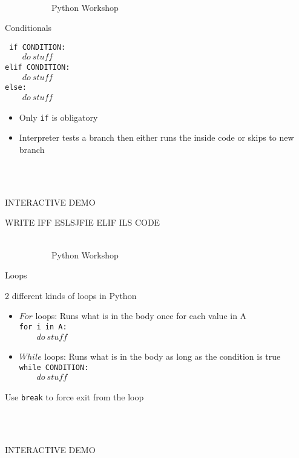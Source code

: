 \documentclass[10pt, xcolor=dvisnames]{beamer}
\begin{document}
\begin{frame}{{\tiny \ \\\vspace{-13pt} \ \ \ \ \ \ \ \ \ \ \ Python Workshop}\\ \centerline{Conditionals}}
\vspace*{-50pt}
\begin{center}
\texttt{
if CONDITION:\\
\ \ \ \ $do\ stuff$\\
elif CONDITION:\\
\ \ \ \ $do\ stuff$\\
else:\\
\ \ \ \ $do\ stuff$\\}\end{center}

\begin{itemize}
\item Only \texttt{if} is obligatory
\item Interpreter tests a branch then either runs the inside code or skips to new branch
\end{itemize}


\ \\
\ \\
\centerline{INTERACTIVE DEMO}
WRITE IFF ESLSJFIE ELIF ILS CODE


\end{frame}





\begin{frame}{{\tiny \ \\\vspace{-13pt} \ \ \ \ \ \ \ \ \ \ \ Python Workshop}\\ \centerline{Loops}}
\vspace*{-50pt}

2 different kinds of loops in Python
\begin{itemize}
\item $For$ loops: Runs what is in the body once for each value in A\\
\texttt{for i in A:\\
\ \ \ \ $do\ stuff$\\}
\item $While$ loops: Runs what is in the body as long as the condition is true\\
\texttt{while CONDITION:\\
\ \ \ \ $do\ stuff$\\}
\end{itemize}

Use \texttt{break} to force exit from the loop


\ \\
\ \\
\centerline{INTERACTIVE DEMO}

\end{frame}
\end{document}
